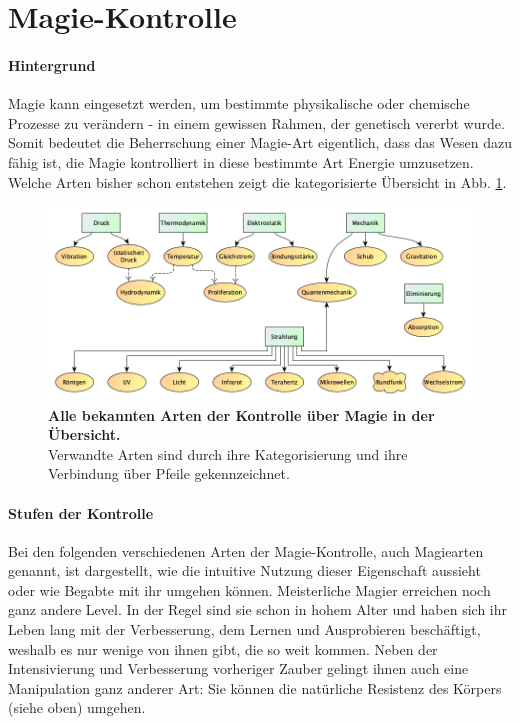 \section{Magie-Kontrolle}
\paragraph{Hintergrund}
Magie kann eingesetzt werden, um bestimmte physikalische oder chemische Prozesse zu verändern - in einem gewissen Rahmen, der genetisch vererbt wurde.
Somit bedeutet die Beherrschung einer Magie-Art eigentlich, dass das Wesen dazu fähig ist, die Magie kontrolliert in diese bestimmte Art Energie umzusetzen.
Welche Arten bisher schon entstehen zeigt die kategorisierte Übersicht in Abb. \ref{fig:magiearten-uebersicht}.

\begin{figure}[htb]
	\centering
	\includegraphics[width=\linewidth]{Abbildungen/Weltenbau/Magie/Magiearten-Uebersicht}
	\caption[Übersicht der Arten der Magiekontrolle]{\textbf{Alle bekannten Arten der Kontrolle über Magie in der Übersicht.} \\ 
	Verwandte Arten sind durch ihre Kategorisierung und ihre Verbindung über Pfeile gekennzeichnet.}
	\label{fig:magiearten-uebersicht}
\end{figure}


\paragraph{Stufen der Kontrolle}
Bei den folgenden verschiedenen Arten der Magie-Kontrolle, auch Magiearten genannt, ist dargestellt, wie die intuitive Nutzung dieser Eigenschaft aussieht oder wie Begabte mit ihr umgehen können.
Meisterliche Magier erreichen noch ganz andere Level. 
In der Regel sind sie schon in hohem Alter und haben sich ihr Leben lang mit der Verbesserung, dem Lernen und Ausprobieren beschäftigt, weshalb es nur wenige von ihnen gibt, die so weit kommen. 
Neben der Intensivierung und Verbesserung vorheriger Zauber gelingt ihnen auch eine Manipulation ganz anderer Art: 
Sie können die natürliche Resistenz des Körpers (siehe oben) umgehen.


